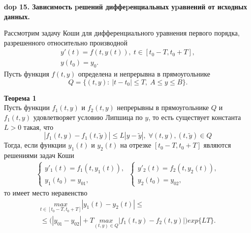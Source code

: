 \setcounter{section}{4}
\setcounter{subsection}{15}
\setcounter{equation}{0}
\textbf{\LARGE dop 15. Зависимость pешений диффеpенциальных уpавнений от исходных данных.}

Рассмотрим задачу Коши для дифференциального уравнения первого порядка, разрешенного относительно производной
\begin{equation*}
\begin{split}
y'(t)=f(t,y(t)), \; t\in [t_0-T,t_0+T],\\
y(t_0)=y_0.
\end{split}
\end{equation*}
Пусть функция $f(t,y)$ определена и непрерывна в прямоугольнике
\begin{equation*}
Q=\{(t,y):\: |t-t_0|\leq T,\; A\leq y\leq B\}.
\end{equation*}

\textbf{Теорема 1}\\
Пусть функции $f_1 (t,y)$ и $f_2 (t,y)$ непрерывны в прямоугольнике $Q$ и $f_1 (t,y)$ удовлетворяет условию Липшица по $y$, то есть существует константа  $L > 0$ такая, что
\begin{equation*}
|f_1(t,y)-f_1(t,\widetilde{y})|\leq L|y-\widetilde{y}|,\; \forall(t,y), (t,\widetilde{y})\in Q
\end{equation*}
Тогда, если функции $y_1(t)$ и $y_2(t)$ на отрезке $[t_0-T,t_0+T]$ являются решениями задач Коши 
\begin{equation*}
\begin{split}
\begin{cases}
y'_1(t)=f_1(t,y_1(t)),\\
y_1(t_0)=y_{01},
\end{cases}
\:
\begin{cases}
y'_2(t)=f_2(t,y_2(t)),\\
y_2(t_0)=y_{02},
\end{cases}
\end{split}
\end{equation*}
то имеет место неравенство 
\begin{equation*}\tag{1}
\begin{split}
\underset{t\in[t_0-T,t_0+T]}{max} |y_1(t)-y_2(t)|\leq \\
\leq \big( |y_{01}-y_{02}|+T \underset{(t,y)\in Q}{max} |f_1(t,y)-f_2(t,y)|\big) exp\{LT\}.
\end{split}
\end{equation*}

